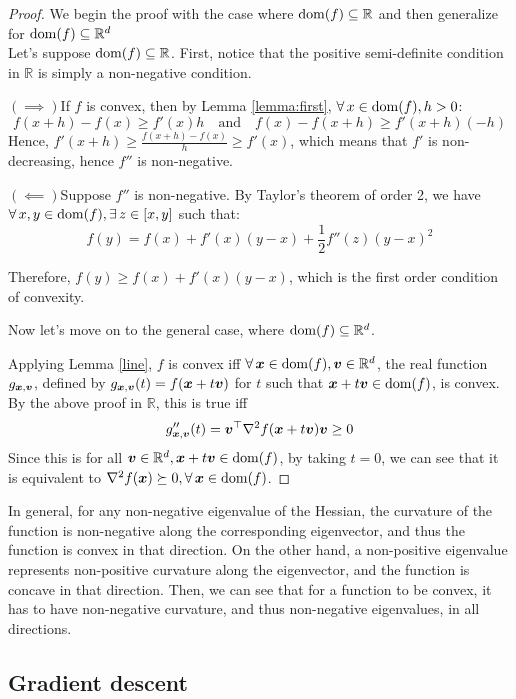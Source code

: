 \documentclass{article}
\newcommand{\R}{\mathbb{R}}
\begin{document}
\begin{proof}\cite{hall2016}
We begin the proof with the case where $\dom(f)\subseteq\R$ and then generalize for $\dom(f)\subseteq\R^d$\\

Let's suppose $\dom(f)\subseteq\R$. First, notice that the positive semi-definite condition in $\R$ is simply a non-negative condition.

$(\implies)$\quad If $f$ is convex, then by Lemma \ref{lemma:first}, $\forall x\in\dom(f), h>0$:
\[
    f(x+h)-f(x)\geq f'(x)h \quad \text{and}\quad f(x)-f(x+h) \geq f'(x+h)(-h)
\]
Hence, $f'(x+h)\geq \frac{f(x+h)-f(x)}{h}\geq f'(x)$, which means that $f'$ is non-decreasing, hence $f''$ is non-negative.

$(\impliedby)$\quad Suppose $f''$ is non-negative. By Taylor's theorem of order 2, we have $\forall x,y \in \dom(f), \exists z\in [x,y]$ such that:
\[
    f(y)=f(x)+f'(x)(y-x)+\frac{1}{2}f''(z)(y-x)^2
\]

Therefore, $f(y)\geq f(x)+f'(x)(y-x)$, which is the first order condition of convexity.

Now let's move on to the general case, where $\dom(f)\subseteq\R^d$.

Applying Lemma \ref{line}, $f$ is convex iff $\forall \vx \in \dom(f), \vv \in \R^d$, the real function $g_{{\bm{x}},{\bm{v}}}$, defined by $g_{{\bm{x}},{\bm{v}}}(t) = f({\bm{x}}+t{\bm{v}})$ for $t$ such that ${\bm{x}}+t{\bm{v}} \in \operatorname{dom}(f)$, is convex.
By the above proof in $\R$, this is true iff
\[
    g_{{\bm{x}},{\bm{v}}}''(t) = {\bm{v}}^\top \nabla^2 f({\bm{x}}+t{\bm{v}}) {\bm{v}} \geq 0
\]
Since this is for all $\vv \in \R^d, \vx+t\vv \in \dom(f)$, by taking $t=0$, we can see that it is equivalent to $\nabla^2 f(\vx)\succeq 0, \forall \vx \in \dom(f)$.
\end{proof}{}

In general, for any non-negative eigenvalue of the Hessian, the curvature of the function is non-negative along the corresponding eigenvector, and thus the function is convex in that direction. 
On the other hand, a non-positive eigenvalue represents non-positive curvature along the eigenvector, and the function is concave in that direction. 
Then, we can see that for a function to be convex, it has to have non-negative curvature, and thus non-negative eigenvalues, in all directions.


\subsection{Gradient descent}
\end{document}
